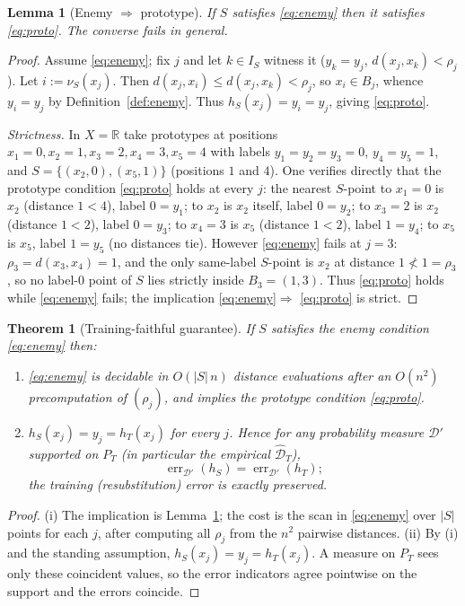 \documentclass{amsart}
\newtheorem{theorem}{Theorem}
\newtheorem{lemma}{Lemma}
\theoremstyle{definition}
\DeclareMathOperator{\err}{err}
\begin{document}
\begin{lemma}[Enemy $\Rightarrow$ prototype]\label{lem:enemy}
If $S$ satisfies \eqref{eq:enemy} then it satisfies \eqref{eq:proto}. The
converse fails in general.
\end{lemma}

\begin{proof}
Assume \eqref{eq:enemy}; fix $j$ and let $k\in I_S$ witness it
($y_k=y_j$, $d(x_j,x_k)<\rho_j$). Let $i:=\nu_S(x_j)$. Then
$d(x_j,x_i)\le d(x_j,x_k)<\rho_j$, so $x_i\in B_j$, whence $y_i=y_j$ by
Definition~\ref{def:enemy}. Thus $h_S(x_j)=y_i=y_j$, giving \eqref{eq:proto}.

\emph{Strictness.} In $X=\mathbb R$ take prototypes at positions
$x_1=0,x_2=1,x_3=2,x_4=3,x_5=4$ with labels $y_1=y_2=y_3=0$, $y_4=y_5=1$, and
$S=\{(x_2,0),(x_5,1)\}$ (positions $1$ and $4$). One verifies directly that the
prototype condition \eqref{eq:proto} holds at every $j$: the nearest $S$-point
to $x_1=0$ is $x_2$ (distance $1<4$), label $0=y_1$; to $x_2$ is $x_2$ itself,
label $0=y_2$; to $x_3=2$ is $x_2$ (distance $1<2$), label $0=y_3$; to $x_4=3$
is $x_5$ (distance $1<2$), label $1=y_4$; to $x_5$ is $x_5$, label $1=y_5$
(no distances tie). However \eqref{eq:enemy} fails at $j=3$: $\rho_3=d(x_3,x_4)
=1$, and the only same-label $S$-point is $x_2$ at distance $1\not<1=\rho_3$, so
no label-$0$ point of $S$ lies strictly inside $B_3=(1,3)$. Thus \eqref{eq:proto}
holds while \eqref{eq:enemy} fails; the implication \eqref{eq:enemy}$\Rightarrow$
\eqref{eq:proto} is strict.
\end{proof}

\begin{theorem}[Training-faithful guarantee]\label{thm:train}
If $S$ satisfies the enemy condition \eqref{eq:enemy} then:
\begin{enumerate}
\item[(i)] \eqref{eq:enemy} is decidable in $O(|S|\,n)$ distance evaluations
after an $O(n^2)$ precomputation of $(\rho_j)$, and implies the prototype
condition \eqref{eq:proto}.
\item[(ii)] $h_S(x_j)=y_j=h_T(x_j)$ for every $j$. Hence for any probability
measure $\mathcal D'$ supported on $P_T$ (in particular the empirical
$\widehat{\mathcal D}_T$),
\[
\err_{\mathcal D'}(h_S)=\err_{\mathcal D'}(h_T);
\]
the training (resubstitution) error is exactly preserved.
\end{enumerate}
\end{theorem}

\begin{proof}
(i) The implication is Lemma~\ref{lem:enemy}; the cost is the scan in
\eqref{eq:enemy} over $|S|$ points for each $j$, after computing all
$\rho_j$ from the $n^2$ pairwise distances.
(ii) By (i) and the standing assumption, $h_S(x_j)=y_j=h_T(x_j)$. A measure on
$P_T$ sees only these coincident values, so the error indicators agree pointwise
on the support and the errors coincide.
\end{proof}
\end{document}
